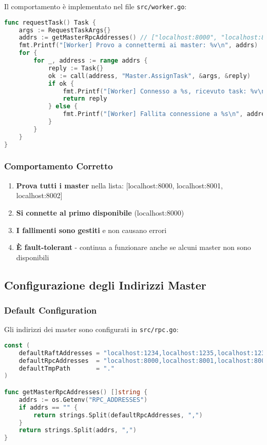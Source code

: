 \documentclass[12pt,a4paper]{article}
\begin{document}
Il comportamento è implementato nel file \texttt{src/worker.go}:

\begin{lstlisting}[language=go]
func requestTask() Task {
    args := RequestTaskArgs{}
    addrs := getMasterRpcAddresses() // ["localhost:8000", "localhost:8001", "localhost:8002"]
    fmt.Printf("[Worker] Provo a connettermi ai master: %v\n", addrs)
    for {
        for _, address := range addrs {
            reply := Task{}
            ok := call(address, "Master.AssignTask", &args, &reply)
            if ok {
                fmt.Printf("[Worker] Connesso a %s, ricevuto task: %v\n", address, reply.Type)
                return reply
            } else {
                fmt.Printf("[Worker] Fallita connessione a %s\n", address)
            }
        }
    }
}
\end{lstlisting}

\subsubsection{Comportamento Corretto}

\begin{enumerate}
\item \textbf{Prova tutti i master} nella lista: [localhost:8000, localhost:8001, localhost:8002]
\item \textbf{Si connette al primo disponibile} (localhost:8000)
\item \textbf{I fallimenti sono gestiti} e non causano errori
\item \textbf{È fault-tolerant} - continua a funzionare anche se alcuni master non sono disponibili
\end{enumerate}

\subsection{Configurazione degli Indirizzi Master}

\subsubsection{Default Configuration}

Gli indirizzi dei master sono configurati in \texttt{src/rpc.go}:

\begin{lstlisting}[language=go]
const (
    defaultRaftAddresses = "localhost:1234,localhost:1235,localhost:1236"
    defaultRpcAddresses  = "localhost:8000,localhost:8001,localhost:8002"
    defaultTmpPath       = "."
)

func getMasterRpcAddresses() []string {
    addrs := os.Getenv("RPC_ADDRESSES")
    if addrs == "" {
        return strings.Split(defaultRpcAddresses, ",")
    }
    return strings.Split(addrs, ",")
}
\end{lstlisting}
\end{document}
